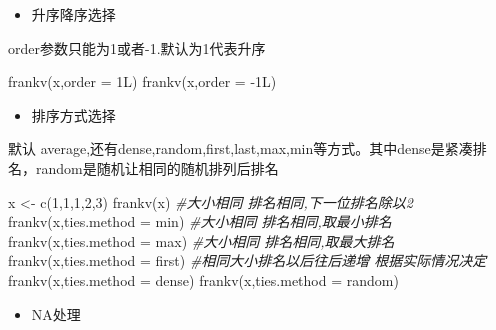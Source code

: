 \documentclass[
]{book}
\newenvironment{Shaded}{\begin{snugshade}}{\end{snugshade}}
\newcommand{\AttributeTok}[1]{\textcolor[rgb]{0.77,0.63,0.00}{#1}}
\newcommand{\CommentTok}[1]{\textcolor[rgb]{0.56,0.35,0.01}{\textit{#1}}}
\newcommand{\DecValTok}[1]{\textcolor[rgb]{0.00,0.00,0.81}{#1}}
\newcommand{\FunctionTok}[1]{\textcolor[rgb]{0.00,0.00,0.00}{#1}}
\newcommand{\NormalTok}[1]{#1}
\newcommand{\OtherTok}[1]{\textcolor[rgb]{0.56,0.35,0.01}{#1}}
\newcommand{\SpecialCharTok}[1]{\textcolor[rgb]{0.00,0.00,0.00}{#1}}
\newcommand{\StringTok}[1]{\textcolor[rgb]{0.31,0.60,0.02}{#1}}
\providecommand{\tightlist}{%
  \setlength{\itemsep}{0pt}\setlength{\parskip}{0pt}}
\begin{document}
\begin{itemize}
\tightlist
\item
  升序降序选择
\end{itemize}

order参数只能为1或者-1.默认为1代表升序

\begin{Shaded}
\begin{Highlighting}[]
\FunctionTok{frankv}\NormalTok{(x,}\AttributeTok{order =}\NormalTok{ 1L)}
\FunctionTok{frankv}\NormalTok{(x,}\AttributeTok{order =} \SpecialCharTok{{-}}\NormalTok{1L)}
\end{Highlighting}
\end{Shaded}

\begin{itemize}
\tightlist
\item
  排序方式选择
\end{itemize}

默认 average,还有dense,random,first,last,max,min等方式。其中dense是紧凑排名，random是随机让相同的随机排列后排名

\begin{Shaded}
\begin{Highlighting}[]
\NormalTok{x }\OtherTok{\textless{}{-}} \FunctionTok{c}\NormalTok{(}\DecValTok{1}\NormalTok{,}\DecValTok{1}\NormalTok{,}\DecValTok{1}\NormalTok{,}\DecValTok{2}\NormalTok{,}\DecValTok{3}\NormalTok{)}
\FunctionTok{frankv}\NormalTok{(x)  }\CommentTok{\#大小相同 排名相同,下一位排名除以2}
\FunctionTok{frankv}\NormalTok{(x,}\AttributeTok{ties.method =} \StringTok{\textquotesingle{}min\textquotesingle{}}\NormalTok{)  }\CommentTok{\#大小相同 排名相同,取最小排名}
\FunctionTok{frankv}\NormalTok{(x,}\AttributeTok{ties.method =} \StringTok{\textquotesingle{}max\textquotesingle{}}\NormalTok{)  }\CommentTok{\#大小相同 排名相同,取最大排名}
\FunctionTok{frankv}\NormalTok{(x,}\AttributeTok{ties.method =} \StringTok{\textquotesingle{}first\textquotesingle{}}\NormalTok{) }\CommentTok{\#相同大小排名以后往后递增 根据实际情况决定}
\FunctionTok{frankv}\NormalTok{(x,}\AttributeTok{ties.method =} \StringTok{\textquotesingle{}dense\textquotesingle{}}\NormalTok{)}
\FunctionTok{frankv}\NormalTok{(x,}\AttributeTok{ties.method =} \StringTok{\textquotesingle{}random\textquotesingle{}}\NormalTok{)}
\end{Highlighting}
\end{Shaded}

\begin{itemize}
\tightlist
\item
  NA处理
\end{itemize}
\end{document}
